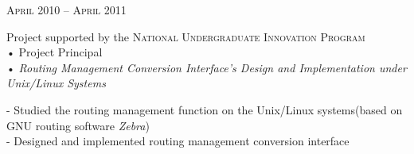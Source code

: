 \documentclass[10pt,a4paper]{article} %
\begin{document}
\begin{minipage}[t]{0.5\textwidth}
{\raggedleft\textsc{April 2010 -- April 2011}\par}

{\raggedright Project supported by the \textsc{National Undergraduate Innovation Program } \\
 • Project Principal\\
 • \textit{Routing Management Conversion Interface’s Design and
Implementation under Unix/Linux Systems}\\}

\normalsize{
-  Studied the routing management function on the Unix/Linux systems(based on GNU routing software \textit{Zebra})\\
-  Designed and implemented routing management conversion interface\\
}\\



\end{minipage} %
\hfill
\end{document}
